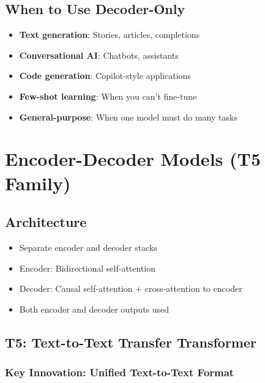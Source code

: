 \subsection{When to Use Decoder-Only}

\begin{itemize}
    \item \textbf{Text generation}: Stories, articles, completions
    \item \textbf{Conversational AI}: Chatbots, assistants
    \item \textbf{Code generation}: Copilot-style applications
    \item \textbf{Few-shot learning}: When you can't fine-tune
    \item \textbf{General-purpose}: When one model must do many tasks
\end{itemize}

\section{Encoder-Decoder Models (T5 Family)}
\label{sec:encoder_decoder}

\subsection{Architecture}

\begin{itemize}
    \item Separate encoder and decoder stacks
    \item Encoder: Bidirectional self-attention
    \item Decoder: Causal self-attention + cross-attention to encoder
    \item Both encoder and decoder outputs used
\end{itemize}

\subsection{T5: Text-to-Text Transfer Transformer}

\subsubsection{Key Innovation: Unified Text-to-Text Format}

